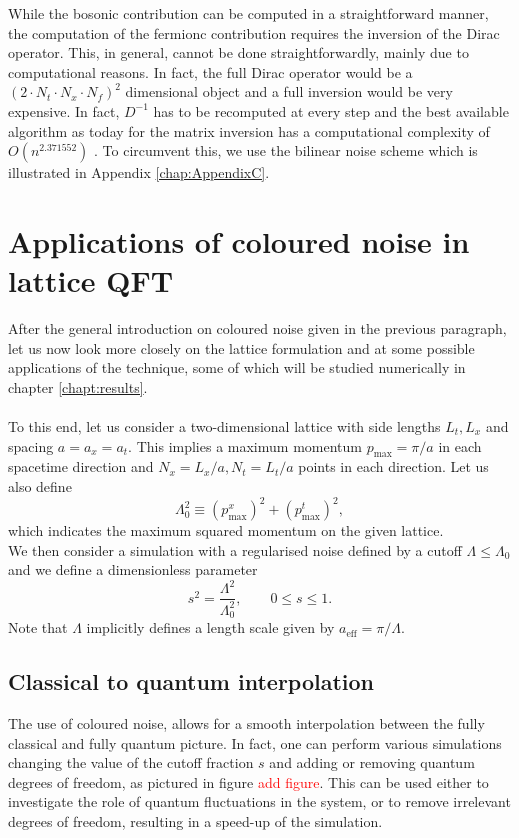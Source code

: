 While the bosonic contribution can be computed in a straightforward manner, the computation of the fermionc contribution requires the inversion of the Dirac operator. This, in general, cannot be done straightforwardly, mainly due to computational reasons.
In fact, the full Dirac operator would be a $(2 \cdot N_t \cdot N_x \cdot N_f)^2$ dimensional object and a full inversion would be very expensive. In fact, $D^{-1}$ has to be recomputed at every step and the best available algorithm as today for the matrix inversion has a computational complexity of $O(n^{2.371552})$ \cite{williams2023new}. To circumvent this, we use the bilinear noise scheme \cite{bilinearnoise1,bilinearnoise2} which is illustrated in Appendix \ref{chap:AppendixC}.

\newpage


\section{Applications of coloured noise in lattice QFT}
\label{sec:lattice_with_coloured_noise}
After the general introduction on coloured noise given in the previous paragraph, let us now look more closely on the lattice formulation and at some possible applications of the technique, some of which will be studied numerically in chapter \ref{chapt:results}. \\~\\
To this end, let us consider a two-dimensional lattice with side lengths $L_t, L_x$ and spacing $a = a_x = a_t$. This implies a maximum momentum $p_\text{max} = \pi / a$ in each spacetime direction and $N_x=L_x/a, N_t=L_t/a$ points in each direction. Let us also define 
\begin{equation}
	\Lambda_0^2 \equiv (p^x_\text{max})^2 + (p^t_\text{max})^2,
\end{equation}
which indicates the maximum squared momentum on the given lattice. \\
We then consider a simulation with a regularised noise defined by a cutoff $\Lambda \leq \Lambda_0$ and we define a dimensionless parameter
\begin{equation}
	s^2 = \frac{\Lambda^2}{\Lambda_0^2}, \qquad 0 \leq s \leq 1.
\end{equation}
Note that $\Lambda$ implicitly defines a length scale given by  $a_\text{eff} = \pi/\Lambda$.\\


\subsection{Classical to quantum interpolation}
The use of coloured noise, allows for a smooth interpolation between the fully classical and fully quantum picture. In fact, one can perform various simulations changing the value of the cutoff fraction $s$ and adding or removing quantum degrees of freedom, as pictured in figure \textcolor{red}{add figure}. This can be used either to investigate the role 
of quantum fluctuations in the system, or to remove irrelevant degrees of freedom, resulting in a speed-up of the simulation.

